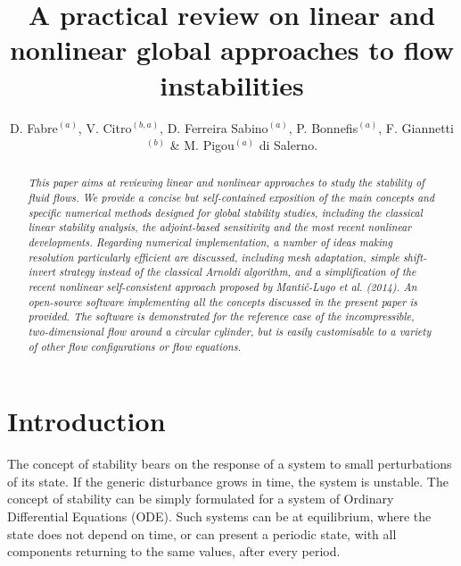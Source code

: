 \documentclass[twocolumn,10pt]{asme2ej}
\title{A practical review on linear and nonlinear global approaches to flow instabilities}
\author{D. Fabre$^{(a)}$,  V. Citro$^{(b,a)}$,  D. Ferreira Sabino$^{(a)}$, P. Bonnefis$^{(a)}$,  F. Giannetti$^{(b)}$ \& M. Pigou$^{(a)}$ 
    \affiliation{
	$^{(a)}$ Institut de M\'ecanique des fluides de Toulouse (IMFT), University of Toulouse \\
	$^{(b)}$ Dipartimento do Ingegneria (DIIN), Universit\`a} di Salerno. 
}
\begin{document}
\lstset{numbers=left, numberstyle=\small, numbersep=8pt, frame = single, language=Matlab, framexleftmargin=15pt}

\maketitle    

\begin{abstract}
{\it 
This paper aims at reviewing linear and nonlinear approaches to study the stability of fluid flows. 
We provide a concise but self-contained exposition of the main concepts and specific numerical methods 
designed for global stability studies, including the classical linear stability analysis, the adjoint-based sensitivity and  
the most recent nonlinear developments. 
Regarding numerical implementation, a number of ideas making resolution particularly efficient are discussed, 
including mesh adaptation, simple shift-invert strategy instead of the classical Arnoldi algorithm, 
and a simplification of the recent nonlinear self-consistent approach proposed by Manti\v{c}-Lugo et al. (2014). 
An open-source software implementing all the concepts discussed in the present paper is provided. 
The software is demonstrated for the reference case of the incompressible, two-dimensional flow around a circular cylinder, but is easily customisable to a variety of other flow configurations or flow equations.
}
\end{abstract}



\section{Introduction}

The concept of stability bears on the response of a system to small perturbations of its state. If the generic disturbance grows in time, the system is unstable. The concept of stability can be simply formulated for a system of Ordinary Differential Equations (ODE). 
Such systems can be at equilibrium, where the state does not depend on time, or can present a periodic state, with all components returning to the same values, after every period. 
\end{document}
